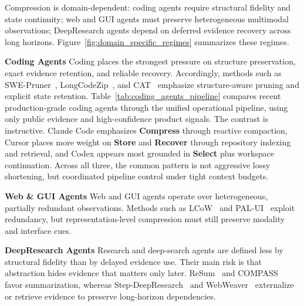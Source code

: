 

Compression is domain-dependent: coding agents require structural fidelity and state continuity; web and GUI agents must preserve heterogeneous multimodal observations; DeepResearch agents depend on deferred evidence recovery across long horizons. Figure~\ref{fig:domain_specific_regimes} summarizes these regimes.



\noindent\textbf{Coding Agents}
Coding places the strongest pressure on structure preservation, exact evidence retention, and reliable recovery. Accordingly, methods such as SWE-Pruner~\citep{wang2026sweprunerselfadaptivecontextpruning}, LongCodeZip~\citep{shi2025longcodezip}, and CAT~\citep{liu2025contexttoolcontextmanagement} emphasize structure-aware pruning and explicit state retention.
Table~\ref{tab:coding_agents_pipeline} compares recent production-grade coding agents through the unified operational pipeline, using only public evidence and high-confidence product signals.
The contrast is instructive. Claude Code emphasizes \textbf{Compress} through reactive compaction, Cursor places more weight on \textbf{Store} and \textbf{Recover} through repository indexing and retrieval, and Codex appears most grounded in \textbf{Select} plus workspace continuation. Across all three, the common pattern is not aggressive lossy shortening, but coordinated pipeline control under tight context budgets.


\noindent\textbf{Web \& GUI Agents}
Web and GUI agents operate over heterogeneous, partially redundant observations. Methods such as LCoW~\citep{lee2025learningcontextualizewebpages} and PAL-UI~\citep{liu2025paluiplanningactivelookback} exploit redundancy, but representation-level compression must still preserve modality and interface cues.

\noindent\textbf{DeepResearch  Agents}
Research and deep-search agents are defined less by structural fidelity than by delayed evidence use. Their main risk is that abstraction hides evidence that matters only later. ReSum~\citep{wu2026resumunlockinglonghorizonsearch} and COMPASS~\citep{wan2025compassenhancingagentlonghorizon} favor summarization, whereas Step-DeepResearch~\citep{hu2025stepdeepresearchtechnicalreport} and WebWeaver~\citep{li2025webweaverstructuringwebscaleevidence} externalize or retrieve evidence to preserve long-horizon dependencies.
